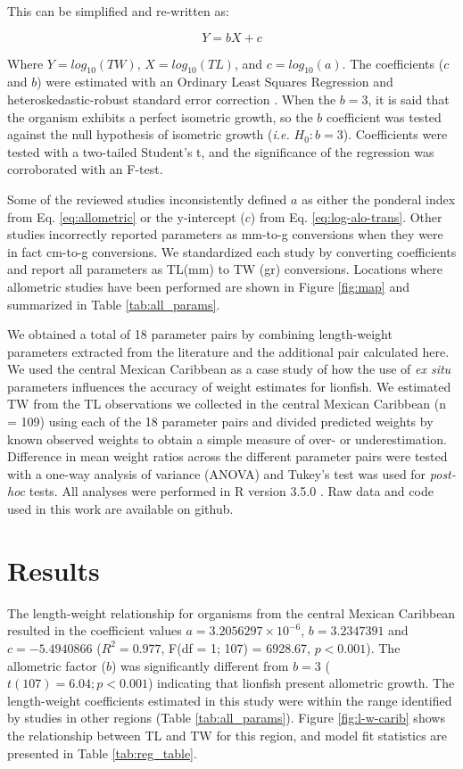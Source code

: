 \documentclass[12pt,]{article}
\theoremstyle{definition}
\theoremstyle{definition}
\theoremstyle{definition}
\theoremstyle{remark}
\begin{document}
This can be simplified and re-written as:

\begin{equation}
\label{eq:log-alo-trans}
Y = bX + c
\end{equation}

Where \(Y = log_{10}(TW)\), \(X = log_{10}(TL)\), and
\(c = log_{10}(a)\). The coefficients (\(c\) and \(b\)) were estimated
with an Ordinary Least Squares Regression and heteroskedastic-robust
standard error correction \citep{zeileis_2004}. When the \(b = 3\), it
is said that the organism exhibits a perfect isometric growth, so the
\(b\) coefficient was tested against the null hypothesis of isometric
growth (\emph{i.e.} \(H_0: b = 3\)). Coefficients were tested with a
two-tailed Student's t, and the significance of the regression was
corroborated with an F-test.

Some of the reviewed studies inconsistently defined \(a\) as either the
ponderal index from Eq. \ref{eq:allometric} or the y-intercept (\(c\))
from Eq. \ref{eq:log-alo-trans}. Other studies incorrectly reported
parameters as mm-to-g conversions when they were in fact cm-to-g
conversions. We standardized each study by converting coefficients and
report all parameters as TL(mm) to TW (gr) conversions. Locations where
allometric studies have been performed are shown in Figure \ref{fig:map}
and summarized in Table \ref{tab:all_params}.

We obtained a total of 18 parameter pairs by combining length-weight
parameters extracted from the literature and the additional pair
calculated here. We used the central Mexican Caribbean as a case study
of how the use of \emph{ex situ} parameters influences the accuracy of
weight estimates for lionfish. We estimated TW from the TL observations
we collected in the central Mexican Caribbean (n = 109) using each of
the 18 parameter pairs and divided predicted weights by known observed
weights to obtain a simple measure of over- or underestimation.
Difference in mean weight ratios across the different parameter pairs
were tested with a one-way analysis of variance (ANOVA) and Tukey's test
was used for \emph{post-hoc} tests. All analyses were performed in R
version 3.5.0 \citep{rcore_2018}. Raw data and code used in this work
are available on github.

\section{Results}\label{results}

The length-weight relationship for organisms from the central Mexican
Caribbean resulted in the coefficient values
\(a = 3.2056297\times 10^{-6}\), \(b = 3.2347391\) and
\(c = -5.4940866\) (\(R^2 = 0.977\), F(df = 1; 107) = 6928.67,
\(p < 0.001\)). The allometric factor (\(b\)) was significantly
different from \(b = 3\) (\(t(107) = 6.04; p<0.001\)) indicating that
lionfish present allometric growth. The length-weight coefficients
estimated in this study were within the range identified by studies in
other regions (Table \ref{tab:all_params}). Figure \ref{fig:l-w-carib}
shows the relationship between TL and TW for this region, and model fit
statistics are presented in Table \ref{tab:reg_table}.
\end{document}
